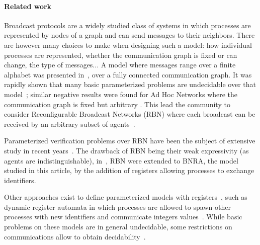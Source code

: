 \paragraph*{Related work} 
Broadcast protocols are a widely studied class of systems in which processes are represented by nodes of a graph and can send messages to their neighbors. There are however many choices to make when designing such a model: how individual processes are represented, whether the communication graph is fixed or can change, the type of messages... 
A model where messages range over a finite alphabet was presented in~\cite{emerson1998model}, over a fully connected communication graph. It was rapidly shown that many basic parameterized problems are undecidable over that model~\cite{EsparzaFM1999verification}; similar negative results were found for Ad Hoc Networks where the communication graph is fixed but arbitrary \cite{DelzannoSZ2010Adhoc}. This lead the community to consider Reconfigurable Broadcast Networks (RBN) where each broadcast can be received by an arbitrary subset of agents~\cite{DelzannoSZ2010Adhoc}.

Parameterized verification problems over RBN have been the subject of extensive study in recent years~\cite{DelzannoSTZ12, Balasubramanian18, BalasubramanianGW22, DBLP:journals/computing/ChiniMS22}. The drawback of RBN being their weak expressivity (as agents are indistinguishable), in~\cite{DelzannoST13}, RBN were extended to BNRA, the model studied in this article, by the addition of registers allowing processes to exchange identifiers. 

Other approaches exist to define parameterized models with registers~\cite{BolligRS21}, such as dynamic register automata in which processes are allowed to spawn other processes with new identifiers and communicate integers values~\cite{AbdullaAKR14}. While basic problems on these models are in general undecidable, some restrictions on communications allow to obtain decidability~\cite{AbdullaAKR15, Rezine17}.

